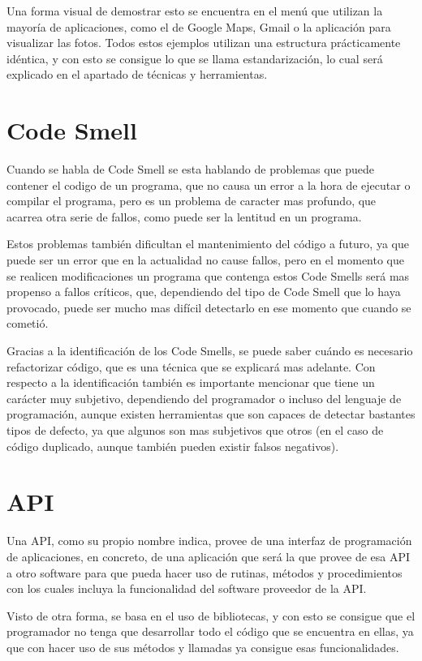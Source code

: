 Una forma visual de demostrar esto se encuentra en el menú que utilizan la mayoría de aplicaciones, como el de Google Maps, Gmail o la aplicación para visualizar las fotos. Todos estos ejemplos utilizan una estructura prácticamente idéntica, y con esto se consigue lo que se llama estandarización, lo cual será explicado en el apartado de técnicas y herramientas.

\section{Code Smell}

Cuando se habla de Code Smell se esta hablando de problemas que puede contener el codigo de un programa, que no causa un error a la hora de ejecutar o compilar el programa, pero es un problema de caracter mas profundo, que acarrea otra serie de fallos, como puede ser la lentitud en un programa.

Estos problemas también dificultan el mantenimiento del código a futuro, ya que puede ser un error que en la actualidad no cause fallos, pero en el momento que se realicen modificaciones un programa que contenga estos Code Smells será mas propenso a fallos críticos, que, dependiendo del tipo de Code Smell que lo haya provocado, puede ser mucho mas difícil detectarlo en ese momento que cuando se cometió.

Gracias a la identificación de los Code Smells, se puede saber cuándo es necesario refactorizar código, que es una técnica que se explicará mas adelante. Con respecto a la identificación también es importante mencionar que tiene un carácter muy subjetivo, dependiendo del programador o incluso del lenguaje de programación, aunque existen herramientas que son capaces de detectar bastantes tipos de defecto, ya que algunos son mas subjetivos que otros (en el caso de código duplicado, aunque también pueden existir falsos negativos).

\section{API}

Una API, como su propio nombre indica, provee de una interfaz de programación de aplicaciones, en concreto, de una aplicación que será la que provee de esa API a otro software para que pueda hacer uso de rutinas, métodos y procedimientos con los cuales incluya la funcionalidad del software proveedor de la API.

Visto de otra forma, se basa en el uso de bibliotecas, y con esto se consigue que el programador no tenga que desarrollar todo el código que se encuentra en ellas, ya que con hacer uso de sus métodos y llamadas ya consigue esas funcionalidades.

